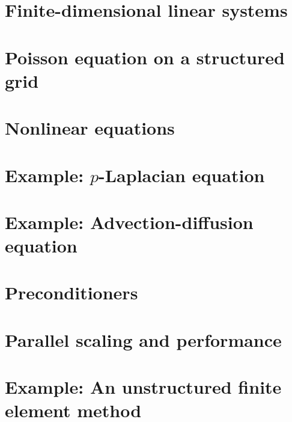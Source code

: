 \documentclass{tufte-book}
\newcommand{\CODELOC}{}  %
\newcommand{\stubinput}[2]{}
\newcommand{\stubinput}[2]{\vspace{5cm} \centerline{\LARGE Percent completed:  \Huge #2\%.} \vfill}
\theoremstyle{definition}
\begin{document}
\chapter{Finite-dimensional linear systems}
\label{chap:ls}
\renewcommand{\CODELOC}{ch2/}


\chapter{Poisson equation on a structured grid}
\label{chap:st}
\renewcommand{\CODELOC}{ch3/}


\chapter{Nonlinear equations}
\label{chap:nl}
\renewcommand{\CODELOC}{ch4/}


\chapter{Example: $p$-Laplacian equation}
\label{chap:of}
\renewcommand{\CODELOC}{ch5/}


\chapter{Example: Advection-diffusion equation}
\label{chap:ad}
\renewcommand{\CODELOC}{ch6/}


\chapter{Preconditioners}
\label{chap:pr}
\renewcommand{\CODELOC}{ch7/}


\chapter{Parallel scaling and performance}
\label{chap:sc}
\renewcommand{\CODELOC}{ch8/}


\chapter{Example: An unstructured finite element method}
\label{chap:un}
\renewcommand{\CODELOC}{ch9/}

\end{document}
